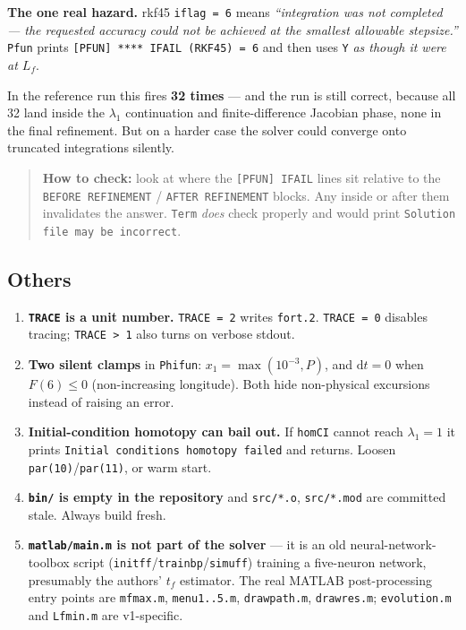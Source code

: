 \documentclass[11pt]{article}
\newcommand{\code}[1]{\texttt{\small #1}}
\newcommand{\file}[1]{\texttt{\small #1}}
\newcommand{\Lf}{L_f}
\begin{document}
\textbf{The one real hazard.} rkf45 \code{iflag = 6} means \emph{``integration
was not completed --- the requested accuracy could not be achieved at the
smallest allowable stepsize.''} \code{Pfun} prints
\code{[PFUN] **** IFAIL (RKF45) = 6} and then uses \code{Y} \emph{as though it
were at $\Lf$}.

In the reference run this fires \textbf{32 times} --- and the run is still
correct, because all 32 land inside the $\lambda_1$ continuation and
finite-difference Jacobian phase, none in the final refinement. But on a
harder case the solver could converge onto truncated integrations silently.

\begin{quote}\small
\textbf{How to check:} look at where the \code{[PFUN] IFAIL} lines sit
relative to the \code{BEFORE REFINEMENT} / \code{AFTER REFINEMENT} blocks. Any
inside or after them invalidates the answer. \code{Term} \emph{does} check
properly and would print \code{Solution file may be incorrect}.
\end{quote}

\subsection{Others}

\begin{enumerate}
\item \textbf{\code{TRACE} is a unit number.} \code{TRACE = 2} writes
      \file{fort.2}. \code{TRACE = 0} disables tracing; \code{TRACE > 1} also
      turns on verbose stdout.
\item \textbf{Two silent clamps} in \code{Phifun}: $x_1 = \max(10^{-3}, P)$,
      and $\mathrm{d}t = 0$ when $F(6) \le 0$ (non-increasing longitude). Both
      hide non-physical excursions instead of raising an error.
\item \textbf{Initial-condition homotopy can bail out.} If
      \code{homCI} cannot reach $\lambda_1 = 1$ it prints
      \code{Initial conditions homotopy failed} and returns. Loosen
      \code{par(10)}/\code{par(11)}, or warm start.
\item \textbf{\file{bin/} is empty in the repository} and \file{src/*.o},
      \file{src/*.mod} are committed stale. Always build fresh.
\item \textbf{\file{matlab/main.m} is not part of the solver} --- it is an old
      neural-network-toolbox script (\code{initff}/\code{trainbp}/\code{simuff})
      training a five-neuron network, presumably the authors' $t_f$ estimator.
      The real MATLAB post-processing entry points are \file{mfmax.m},
      \file{menu1..5.m}, \file{drawpath.m}, \file{drawres.m};
      \file{evolution.m} and \file{Lfmin.m} are v1-specific.
\end{enumerate}
\end{document}
